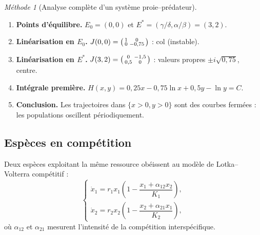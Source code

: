 \documentclass[12pt,a4paper,openany]{book}
\theoremstyle{definition}
\theoremstyle{plain}
\theoremstyle{remark}
\newtheorem{methode}[definition]{Méthode}
\begin{document}
\begin{methode}[Analyse complète d'un système proie--prédateur]
\label{meth:LV}
\begin{enumerate}
  \item \textbf{Points d'équilibre.} $E_0 = (0,0)$ et
        $E^* = (\gamma/\delta, \alpha/\beta) = (3, 2)$.
  \item \textbf{Linéarisation en $E_0$.}
        $J(0,0) = \begin{psmallmatrix} 1 & 0 \\ 0 & -0{,}75
        \end{psmallmatrix}$ : col (instable).
  \item \textbf{Linéarisation en $E^*$.}
        $J(3,2) = \begin{psmallmatrix} 0 & -1{,}5 \\ 0{,}5 & 0
        \end{psmallmatrix}$ : valeurs propres $\pm i\sqrt{0{,}75}$,
        centre.
  \item \textbf{Intégrale première.}
        $H(x,y) = 0{,}25 x - 0{,}75\ln x + 0{,}5 y - \ln y = C$.
  \item \textbf{Conclusion.} Les trajectoires dans $\{x>0, y>0\}$
        sont des courbes fermées : les populations oscillent
        périodiquement.
\end{enumerate}
\end{methode}

\subsection{Espèces en compétition}
\label{subsec:competition}

Deux espèces exploitant la même ressource obéissent au modèle de
Lotka--Volterra compétitif :
\begin{equation}
\label{eq:competition}
\begin{cases}
\dot{x}_1 = r_1 x_1\!\left(1 - \dfrac{x_1 + \alpha_{12}x_2}{K_1}\right), \\[8pt]
\dot{x}_2 = r_2 x_2\!\left(1 - \dfrac{x_2 + \alpha_{21}x_1}{K_2}\right),
\end{cases}
\end{equation}
où $\alpha_{12}$ et $\alpha_{21}$ mesurent l'intensité de la
compétition interspécifique.
\end{document}
